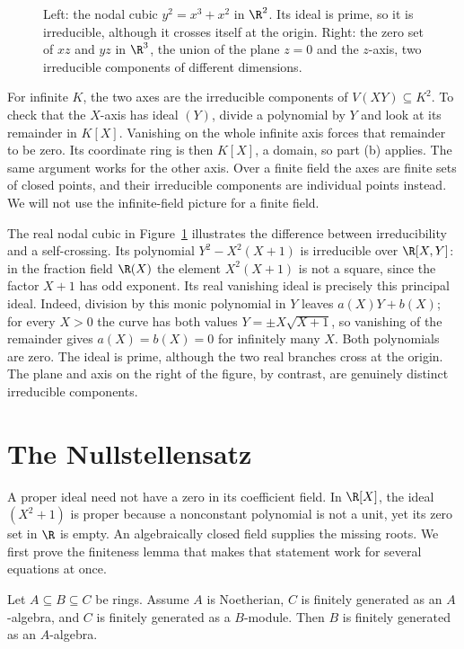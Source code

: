 \begin{figure}[ht]
\centering
{}
\caption{Left: the nodal cubic $y^2=x^3+x^2$ in $\R^2$. Its ideal is prime, so it is irreducible, although it crosses itself at the origin. Right: the zero set of $xz$ and $yz$ in $\R^3$, the union of the plane $z=0$ and
the $z$-axis, two irreducible components of different dimensions.}
\label{fig:varieties}
\end{figure}

For infinite $K$, the two axes are the irreducible components of $V(XY)\subseteq K^2$. To check that the $X$-axis has ideal $(Y)$, divide a polynomial by $Y$ and look at its remainder in $K[X]$. Vanishing on the whole infinite axis forces that remainder to be zero. Its coordinate ring is then $K[X]$, a domain, so part (b) applies. The same argument works for the other axis. Over a finite field the axes are finite sets of closed points, and their irreducible components are individual points instead. We will not use the infinite-field picture for a finite field.

The real nodal cubic in Figure~\ref{fig:varieties} illustrates the difference between irreducibility and a self-crossing. Its polynomial $Y^2-X^2(X+1)$ is irreducible over $\R[X,Y]$: in the fraction field $\R(X)$ the element $X^2(X+1)$ is not a square, since the factor $X+1$ has odd exponent. Its real vanishing ideal is precisely this principal ideal. Indeed, division by this monic polynomial in $Y$ leaves $a(X)Y+b(X)$; for every $X>0$ the curve has both values $Y=\pm X\sqrt{X+1}$, so vanishing of the remainder gives $a(X)=b(X)=0$ for infinitely many $X$. Both polynomials are zero. The ideal is prime, although the two real branches cross at the origin. The plane and axis on the right of the figure, by contrast, are genuinely distinct irreducible components.

\section{The Nullstellensatz}

A proper ideal need not have a zero in its coefficient field. In $\R[X]$, the ideal $(X^2+1)$ is proper because a nonconstant polynomial is not a unit, yet its zero set in $\R$ is empty. An algebraically closed field supplies the missing roots. We first prove the finiteness lemma that makes that statement work for several equations at once.

\begin{lemma}\label{lem:artintate}
Let $A\subseteq B\subseteq C$ be rings. Assume $A$ is Noetherian, $C$ is finitely generated as an $A$-algebra, and $C$ is finitely generated as a $B$-module. Then $B$ is finitely generated as an $A$-algebra.
\end{lemma}

